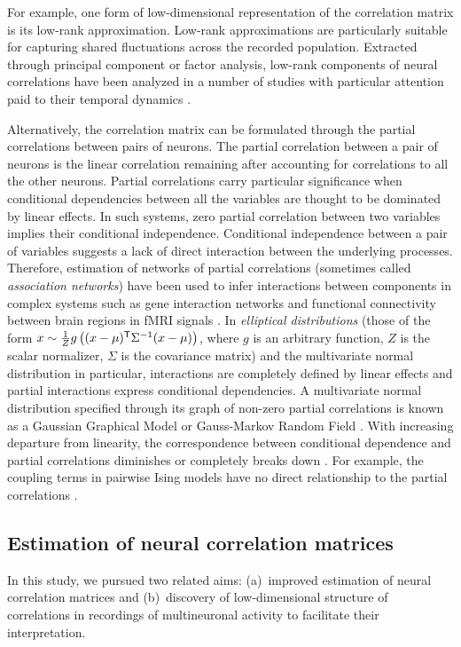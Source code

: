 \documentclass[10pt]{article}
\newcommand{\T}{{\sf T}}
\begin{document}
For example, one form of low-dimensional representation of the correlation matrix is its low-rank approximation. Low-rank approximations are particularly suitable for capturing shared fluctuations across the recorded population. Extracted through principal component or factor analysis, low-rank components of neural correlations have been analyzed in a number of studies with particular attention paid to their temporal dynamics \cite{Yu:2009}. 

Alternatively, the correlation matrix can be formulated through the partial correlations between pairs of neurons. The partial correlation between a pair of neurons is the linear correlation remaining after accounting for correlations to all the other neurons. Partial correlations carry particular significance when conditional dependencies between all the variables are thought to be dominated by linear effects. In such systems, zero  partial correlation between two variables implies their conditional independence.  Conditional independence between a pair of variables suggests a lack of direct interaction between the underlying processes. Therefore, estimation of networks of partial correlations (sometimes called \emph{association networks}) have been used to infer interactions between components in complex systems such as gene interaction networks \cite{Schafer:2005,Peng:2009} and functional connectivity between brain regions in fMRI signals \cite{Varoquaux:2012,Ryali:2012}. In \emph{elliptical distributions} (those of the form $x \sim \frac 1 Z g\left((x-\mu)^\T\Sigma^{-1}(x-\mu)\right)$, where $g$ is an arbitrary function, $Z$ is the scalar normalizer, $\Sigma$ is the covariance matrix) and the multivariate normal distribution in particular, interactions are completely defined by linear effects and partial interactions express conditional dependencies. A multivariate normal distribution specified through its graph of non-zero partial correlations is known as a Gaussian Graphical Model or Gauss-Markov Random Field \cite{Koller:2009}. With increasing departure from linearity, the correspondence between conditional dependence and partial correlations diminishes or completely breaks down \cite{Loh:2012}. For example, the coupling terms in pairwise Ising models have no direct relationship to the partial correlations \cite{Schneidman:2006,Tkacik:2006}.

\subsection*{Estimation of neural correlation matrices}
In this study, we pursued two related aims: (a)~improved estimation of neural correlation matrices and (b)~discovery of low-dimensional structure of correlations in recordings of multineuronal activity to facilitate their interpretation.  
\end{document}
